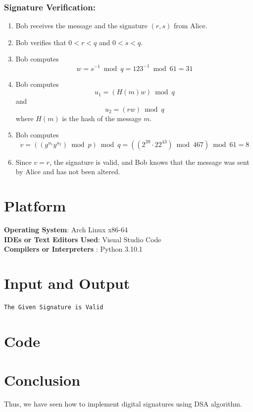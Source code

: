 \documentclass[11pt]{article}
\begin{document}
\subsubsection{Signature Verification:}

\begin{enumerate}
    \item Bob receives the message and the signature $(r, s)$ from Alice.
    \item Bob verifies that $0 < r < q$ and $0 < s < q$.
    \item Bob computes $$w = s^{-1} \bmod q = 123^{-1} \bmod 61 = 31$$
    \item Bob computes $$u_1 = (H(m)w) \bmod q$$ and $$u_2 = (rw) \bmod q$$where $H(m)$ is the hash of the message $m$.
    \item Bob computes $$v = ((g^{u_1} y^{u_2}) \bmod p) \bmod q = ((2^{39} \cdot 22^{43}) \bmod 467) \bmod 61 = 8$$
    \item Since $v = r$, the signature is valid, and Bob knows that the message was sent by Alice and has not been altered.
\end{enumerate}


\section{Platform}
\textbf{\textbf{Operating System}}: Arch Linux x86-64 \\
\textbf{\textbf{IDEs or Text Editors Used}}: Visual Studio Code\\
\textbf{\textbf{Compilers or Interpreters} }: Python 3.10.1\\

\section{Input and Output}

\begin{verbatim}
The Given Signature is Valid
\end{verbatim}


\section{Code}


\section{Conclusion}
Thus, we have seen how to implement digital signatures using DSA algorithm.
\clearpage
\end{document}
